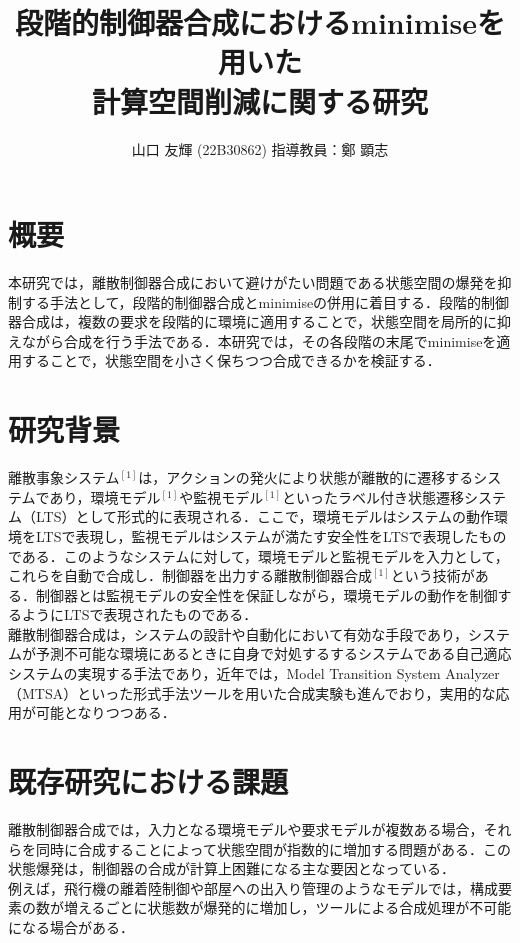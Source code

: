 \documentclass[11pt]{jarticle}
\begin{document}
\title{段階的制御器合成におけるminimiseを用いた\\計算空間削減に関する研究}
\author{山口 友輝 (22B30862) \;\; 指導教員：鄭 顕志}
\date{\empty} %
\maketitle %
\thispagestyle{fancy}

\section{概要} 
本研究では，離散制御器合成において避けがたい問題である状態空間の爆発を抑制する手法として，段階的制御器合成とminimiseの併用に着目する．段階的制御器合成は，複数の要求を段階的に環境に適用することで，状態空間を局所的に抑えながら合成を行う手法である．本研究では，その各段階の末尾でminimiseを適用することで，状態空間を小さく保ちつつ合成できるかを検証する．

\section{研究背景}
離散事象システム$^{[1]}$は，アクションの発火により状態が離散的に遷移するシステムであり，環境モデル$^{[1]}$や監視モデル$^{[1]}$といったラベル付き状態遷移システム（LTS）として形式的に表現される．ここで，環境モデルはシステムの動作環境をLTSで表現し，監視モデルはシステムが満たす安全性をLTSで表現したものである．このようなシステムに対して，環境モデルと監視モデルを入力として，これらを自動で合成し．制御器を出力する離散制御器合成$^{[1]}$という技術がある．制御器とは監視モデルの安全性を保証しながら，環境モデルの動作を制御するようにLTSで表現されたものである．\\
\indent
離散制御器合成は，システムの設計や自動化において有効な手段であり，システムが予測不可能な環境にあるときに自身で対処するするシステムである自己適応システムの実現する手法であり，近年では，Model Transition System Analyzer（MTSA）といった形式手法ツールを用いた合成実験も進んでおり，実用的な応用が可能となりつつある．

\section{既存研究における課題}
離散制御器合成では，入力となる環境モデルや要求モデルが複数ある場合，それらを同時に合成することによって状態空間が指数的に増加する問題がある．この状態爆発は，制御器の合成が計算上困難になる主な要因となっている．\\
\indent
例えば，飛行機の離着陸制御や部屋への出入り管理のようなモデルでは，構成要素の数が増えるごとに状態数が爆発的に増加し，ツールによる合成処理が不可能になる場合がある．
\end{document}
